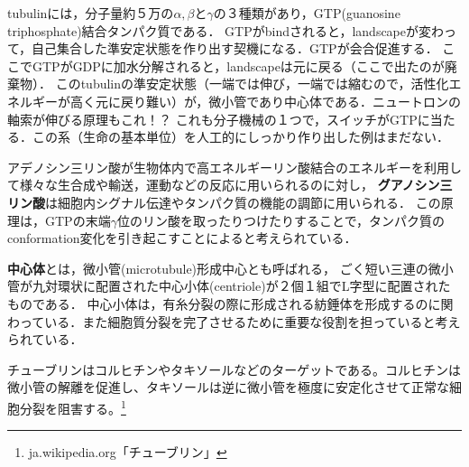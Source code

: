 \documentclass[uplatex, dvipdfmx]{jsreport}
\begin{document}
\begin{example}\label{example-tubulin-dimer}
    tubulinには，分子量約５万の$\alpha,\beta$と$\gamma$の３種類があり，GTP(guanosine triphosphate)結合タンパク質である．
    GTPがbindされると，landscapeが変わって，自己集合した準安定状態を作り出す契機になる．GTPが会合促進する．
    ここでGTPがGDPに加水分解されると，landscapeは元に戻る（ここで出たのが廃棄物）．
    このtubulinの準安定状態（一端では伸び，一端では縮むので，活性化エネルギーが高く元に戻り難い）が，微小管であり中心体である．ニュートロンの軸索が伸びる原理もこれ！？
    これも分子機械の１つで，スイッチがGTPに当たる．この系（生命の基本単位）を人工的にしっかり作り出した例はまだない．
\end{example}
\begin{definition}
    アデノシン三リン酸が生物体内で高エネルギーリン酸結合のエネルギーを利用して様々な生合成や輸送，運動などの反応に用いられるのに対し，
    \textbf{グアノシン三リン酸}は細胞内シグナル伝達やタンパク質の機能の調節に用いられる．
    この原理は，GTPの末端$\gamma$位のリン酸を取ったりつけたりすることで，タンパク質のconformation変化を引き起こすことによると考えられている．
\end{definition}
\begin{definition}
    \textbf{中心体}とは，微小管(microtubule)形成中心とも呼ばれる，
    ごく短い三連の微小管が九対環状に配置された中心小体(centriole)が２個１組でL字型に配置されたものである．
    中心小体は，有糸分裂の際に形成される紡錘体を形成するのに関わっている．また細胞質分裂を完了させるために重要な役割を担っていると考えられている．
\end{definition}
\begin{remark}
    チューブリンはコルヒチンやタキソールなどのターゲットである。コルヒチンは微小管の解離を促進し、タキソールは逆に微小管を極度に安定化させて正常な細胞分裂を阻害する。\footnote{ja.wikipedia.org「チューブリン」}
\end{remark}
\end{document}
